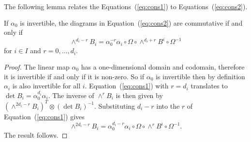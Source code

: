 \documentclass{amsart}
\theoremstyle{definition}
\newcommand\VW{V_W}
\begin{document}






The following lemma relates the Equations~(\ref{eq:cons1}) to Equations~(\ref{eq:cons2}).

\begin{lemma}
If $\alpha_0$ is invertible, the diagrams in Equation~(\ref{eq:cons2}) are commutative if and only if
$$\wedge^{d_i-r} B_i = \alpha_0^{-r} \alpha_i \circ \Omega \circ \wedge^{d_i+r} B^i \circ \Omega^{-1}$$
for $i\in I$ and $r=0,\ldots,d_i$.
\end{lemma}

\begin{proof}
The linear map $\alpha_0$ has a one-dimensional domain and codomain, therefore it is invertible if and only if it is non-zero.
So if $\alpha_0$ is invertible then by definition $\alpha_i$ is also invertible for all $i$.
Equation~(\ref{eq:cons1}) with $r=d_i$ translates to $\det B_i= \alpha_0^{d_i} \alpha_i$.
The inverse of $\wedge^r B_i$ is then given by $(\wedge^{2d_i-r}B_i)^T \otimes (\det B_i)^{-1}$.
Substituting $d_i-r$ into the $r$ of Equation~(\ref{eq:cons1}) gives $$\wedge^{2d_i-r} B_i = \alpha_0^{d_i-r} \alpha_i \circ \Omega \circ \wedge ^r B^i \circ \Omega^{-1}.$$
The result follows.
\end{proof}
\end{document}
